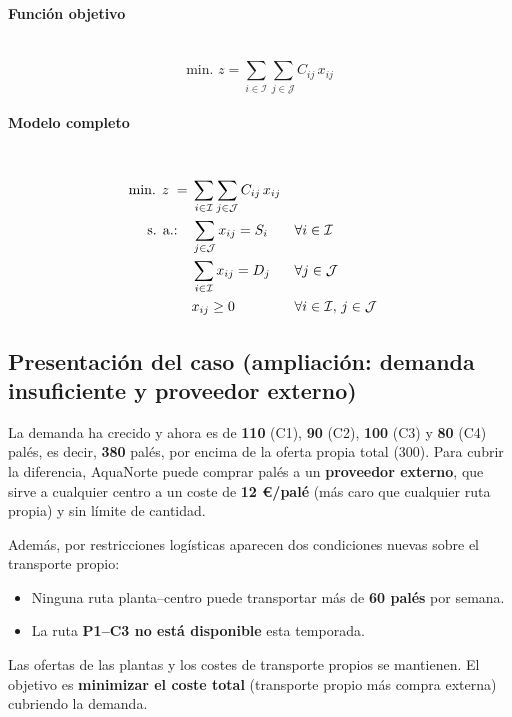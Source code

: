 \paragraph{Función objetivo}\mbox{}\\
\begin{equation}
\mbox{min. } z = \sum_{i \in \mathcal{I}} \sum_{j \in \mathcal{J}} C_{ij}\, x_{ij}
\end{equation}

\paragraph{Modelo completo}\mbox{}\\
\begin{align}
\mbox{min. } z \;=\;& \sum_{i \in \mathcal{I}} \sum_{j \in \mathcal{J}} C_{ij}\, x_{ij} \notag\\
\mbox{s. a.:}\quad
& \sum_{j \in \mathcal{J}} x_{ij} = S_i && \forall i \in \mathcal{I} \notag\\
& \sum_{i \in \mathcal{I}} x_{ij} = D_j && \forall j \in \mathcal{J} \notag\\
& x_{ij} \geq 0 && \forall i \in \mathcal{I},\, j \in \mathcal{J} \notag
\end{align}


\subsection{Presentación del caso (ampliación: demanda insuficiente y proveedor externo)}

La demanda ha crecido y ahora es de \textbf{110} (C1), \textbf{90} (C2), \textbf{100} (C3) y \textbf{80} (C4) palés, es decir, \textbf{380} palés, por encima de la oferta propia total (300). Para cubrir la diferencia, AquaNorte puede comprar palés a un \textbf{proveedor externo}, que sirve a cualquier centro a un coste de \textbf{12 €/palé} (más caro que cualquier ruta propia) y sin límite de cantidad.

Además, por restricciones logísticas aparecen dos condiciones nuevas sobre el transporte propio:
\begin{itemize}
    \item Ninguna ruta planta--centro puede transportar más de \textbf{60 palés} por semana.
    \item La ruta \textbf{P1--C3 no está disponible} esta temporada.
\end{itemize}

Las ofertas de las plantas y los costes de transporte propios se mantienen. El objetivo es \textbf{minimizar el coste total} (transporte propio más compra externa) cubriendo la demanda.

